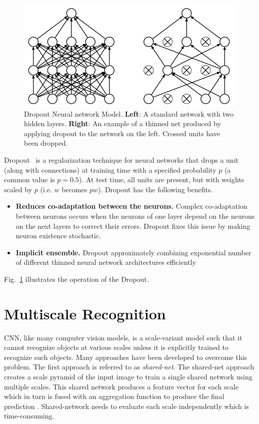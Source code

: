 \begin{figure}
    \begin{center}
        \includegraphics[width=\textwidth]{Figures/oriDropout.png}
        \caption{\label{fig:Dropout} Dropout Neural network Model. \textbf{Left}: A standard network with two hidden layers. \textbf{Right}: An example of a thinned net produced by applying dropout to the network on the left. Crossed units have been dropped.}
    \end{center}
\end{figure}
Dropout~\cite{srivastava2014dropout} is a regularization technique for neural networks that drops a unit (along with connections) at training time with a specified probability $p$ (a common value is $p=0.5$). At test time, all units are present, but with weights scaled by $p$ (i.e. $w$ becomes $pw$).
Dropout has the following benefits. 
\begin{itemize}
    \item \textbf{Reduces co-adaptation between the neurons.} Complex co-adaptation between neurons occurs when the neurons of one layer depend on the neurons on the next layers to correct their errors. Dropout fixes this issue by making neuron existence stochastic.
    \item \textbf{Implicit ensemble.} Dropout  approximately combining exponential number of different thinned neural network architectures efficiently
\end{itemize}
Fig.~\ref{fig:Dropout} illustrates the operation of the Dropout.

\section{Multiscale Recognition}
CNN,  like many computer vision models, is a scale-variant \cite{van2017learning} model such that it cannot recognize objects at various scales unless it is explicitly trained to recognize such objects. Many approaches have been developed to overcome this problem. The first approach is referred to as \textit{shared-net}. The shared-net approach creates a scale pyramid of the input image to train a single shared network using multiple scales. This shared network produces a feature vector for each scale which in turn is fused with an aggregation function to produce the final prediction \cite{farabet2012learning}\cite{lin2016efficient}\cite{felzenszwalb2009object}\cite{ciregan2012multi}. Shared-network needs to evaluate each scale independently which is time-consuming.

